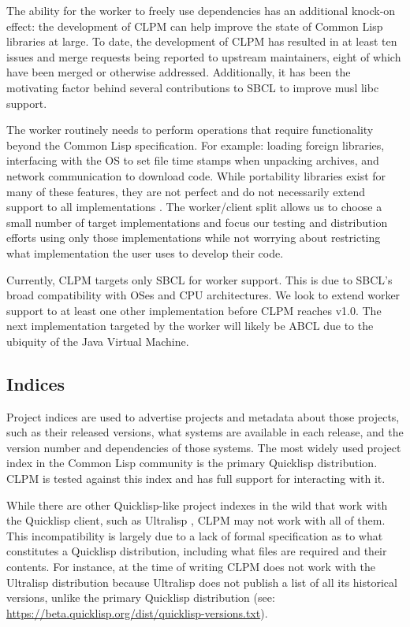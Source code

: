 \documentclass[format=sigconf]{acmart}
\begin{document}
The ability for the worker to freely use dependencies has an additional
knock-on effect: the development of CLPM can help improve the state of Common
Lisp libraries at large. To date, the development of CLPM has resulted in at
least ten issues and merge requests being reported to upstream maintainers,
eight of which have been merged or otherwise addressed. Additionally, it has
been the motivating factor behind several contributions to SBCL to improve musl
libc support.

The worker routinely needs to perform operations that require functionality
beyond the Common Lisp specification. For example: loading foreign libraries,
interfacing with the OS to set file time stamps when unpacking archives, and
network communication to download code. While portability libraries exist for
many of these features, they are not perfect and do not necessarily extend
support to all implementations \cite{portability}. The worker/client split
allows us to choose a small number of target implementations and focus our
testing and distribution efforts using only those implementations while not
worrying about restricting what implementation the user uses to develop their
code.

Currently, CLPM targets only SBCL \cite{sbcl} for worker support. This is due
to SBCL's broad compatibility with OSes and CPU architectures. We look to
extend worker support to at least one other implementation before CLPM reaches
v1.0. The next implementation targeted by the worker will likely be ABCL
\cite{abcl} due to the ubiquity of the Java Virtual Machine.

\subsection{Indices}

Project indices are used to advertise projects and metadata about those
projects, such as their released versions, what systems are available in each
release, and the version number and dependencies of those systems. The most
widely used project index in the Common Lisp community is the primary Quicklisp
distribution. CLPM is tested against this index and has full support for
interacting with it.

While there are other Quicklisp-like project indexes in the wild that work with
the Quicklisp client, such as Ultralisp \cite{ultralisp}, CLPM may not work
with all of them. This incompatibility is largely due to a lack of formal
specification as to what constitutes a Quicklisp distribution, including what
files are required and their contents. For instance, at the time of writing
CLPM does not work with the Ultralisp distribution because Ultralisp does not
publish a list of all its historical versions, unlike the primary Quicklisp
distribution (see:
\url{https://beta.quicklisp.org/dist/quicklisp-versions.txt}).
\end{document}
